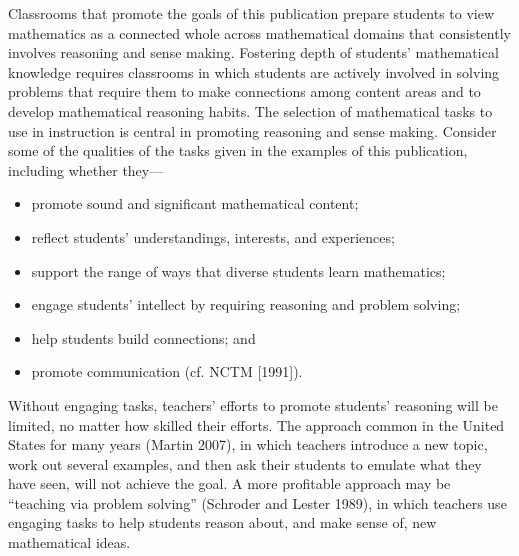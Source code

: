 \documentclass[
  10pt,
  a4paper,
  landscape,
  twoside,
  openany
]{scrbook}
\newcommand{\EN}[1]{#1}
\newcounter{example}
\begin{document}
\TriPara
{
\EN{Classrooms that promote the goals of this publication prepare students to view mathematics as a connected whole across mathematical domains that consistently involves reasoning and sense making. Fostering depth of students' mathematical knowledge requires classrooms in which students are actively involved in solving problems that require them to make connections among content areas and to develop mathematical reasoning habits. The selection of mathematical tasks to use in instruction is central in promoting reasoning and sense making. Consider some of the qualities of the tasks given in the examples of this publication, including whether they---

\begin{itemize}
  \item promote sound and significant mathematical content;
  \item reflect students' understandings, interests, and experiences;
  \item support the range of ways that diverse students learn mathematics;
  \item engage students' intellect by requiring reasoning and problem solving;
  \item help students build connections; and
  \item promote communication (cf. NCTM [1991]).
\end{itemize}

Without engaging tasks, teachers' efforts to promote students' reasoning will be limited, no matter how skilled their efforts. The approach common in the United States for many years (Martin 2007), in which teachers introduce a new topic, work out several examples, and then ask their students to emulate what they have seen, will not achieve the goal. A more profitable approach may be ``teaching via problem solving'' (Schroder and Lester 1989), in which teachers use engaging tasks to help students reason about, and make sense of, new mathematical ideas.}
}
\end{document}
